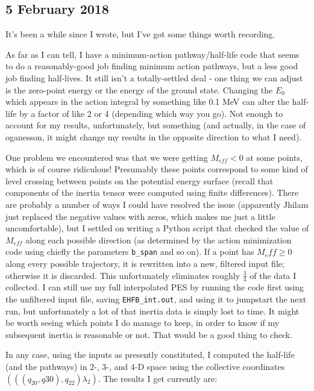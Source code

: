 \documentclass[]{report}
\begin{document}
\subsection*{5 February 2018}
It's been a while since I wrote, but I've got some things worth recording.

As far as I can tell, I have a minimum-action pathway/half-life code that seems to do a reasonably-good job finding minimum action pathways, but a less good job finding half-lives. It still isn't a totally-settled deal - one thing we can adjust is the zero-point energy or the energy of the ground state. Changing the $E_0$ which appears in the action integral by something like 0.1 MeV can alter the half-life by a factor of like 2 or 4 (depending which way you go). Not enough to account for my results, unfortunately, but something (and actually, in the case of oganesson, it might change my results in the opposite direction to what I need).

One problem we encountered was that we were getting $M_{eff}<0$ at some points, which is of course ridiculous! Presumably these points correspond to some kind of level crossing between points on the potential energy surface (recall that components of the inertia tensor were computed using finite differences). There are probably a number of ways I could have resolved the issue (apparently Jhilam just replaced the negative values with zeros, which makes me just a little uncomfortable), but I settled on writing a Python script that checked the value of $M_{eff}$ along each possible direction (as determined by the action minimization code using chiefly the parameters \texttt{b\_span} and so on). If a point has $M_eff\geq0$ along every possible trajectory, it is rewritten into a new, filtered input file; otherwise it is discarded. This unfortunately eliminates roughly $\frac{3}{4}$ of the data I collected. I can still use my full interpolated PES by running the code first using the unfiltered input file, saving \texttt{EHFB\_int.out}, and using it to jumpstart the next run, but unfortunately a lot of that inertia data is simply lost to time. It might be worth seeing which points I do manage to keep, in order to know if my subsequent inertia is reasonable or not. That would be a good thing to check.

In any case, using the inputs as presently constituted, I computed the half-life (and the pathways) in 2-, 3-, and 4-D space using the collective coordinates $(((q_{20},q{30}),q_{22})\lambda_2)$. The results I get currently are:
\end{document}
